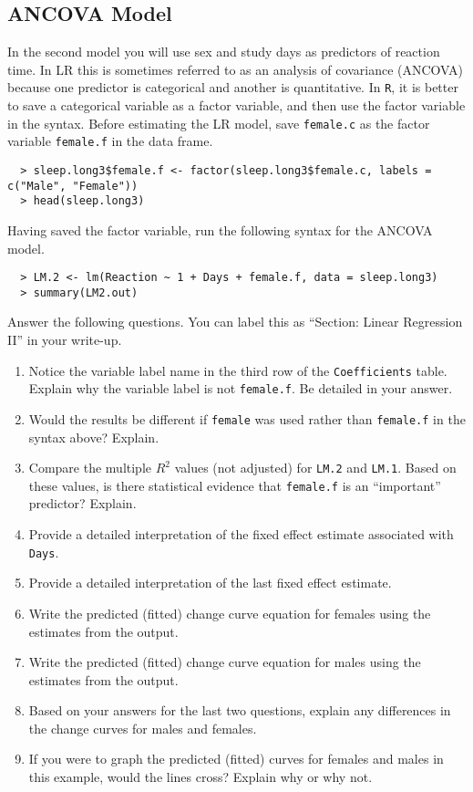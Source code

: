 \documentclass[]{article}
\begin{document}
%
%
\pagebreak
\subsection*{ANCOVA Model}

\noindent In the second model you will use sex and study days as predictors of reaction time. In LR this is sometimes referred to as an analysis of covariance (ANCOVA) because one predictor is categorical and another is quantitative. In \texttt{R}, it is better to save a categorical variable as a factor
variable, and then use the factor variable in the syntax. Before estimating the LR model, save
\texttt{female.c} as the factor variable \texttt{female.f} in the data frame.

\begin{verbatim}
  > sleep.long3$female.f <- factor(sleep.long3$female.c, labels = c("Male", "Female"))
  > head(sleep.long3)
\end{verbatim}

\noindent Having saved the factor variable, run the following syntax for the ANCOVA model.

\begin{verbatim}
  > LM.2 <- lm(Reaction ~ 1 + Days + female.f, data = sleep.long3)
  > summary(LM2.out)
\end{verbatim}

\noindent Answer the following questions. You can label this as ``Section: Linear Regression II'' in your write-up.

\begin{enumerate}[resume]
\item Notice the variable label name in the third row of the \texttt{Coefficients} table. Explain why the variable label is not \texttt{female.f}. Be detailed in your answer.
\item Would the results be different if \texttt{female} was used rather than \texttt{female.f} in the syntax above? Explain.
\item Compare the multiple $R^2$ values (not adjusted) for \texttt{LM.2} and \texttt{LM.1}. Based on these values, is there statistical evidence that \texttt{female.f} is an ``important'' predictor? Explain.
\item Provide a detailed interpretation of the fixed effect estimate associated with \texttt{Days}.
\item Provide a detailed interpretation of the last fixed effect estimate.
\item Write the predicted (fitted) change curve equation for females using the estimates from the output.
\item Write the predicted (fitted) change curve equation for males using the estimates from the output.
\item Based on your answers for the last two questions, explain any differences in the change curves for males and females.
\item If you were to graph the predicted (fitted) curves for females and males in this example, would the lines cross? Explain why or why not.
\end{enumerate}
\end{document}

